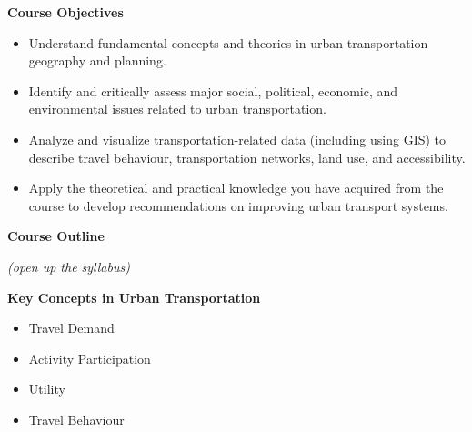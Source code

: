 \documentclass[aspectratio=169]{beamer}
\begin{document}
\begin{frame}

\textbf{Course Objectives}
		\small
		\begin{itemize}
			\item Understand fundamental concepts and theories in urban transportation geography and planning.
			
			\item Identify and critically assess major social, political, economic, and environmental issues related to urban transportation.
			
			\item Analyze and visualize transportation-related data (including using GIS) to describe travel behaviour, transportation networks, land use, and accessibility.
			
			\item Apply the theoretical and practical knowledge you have acquired from the course to develop recommendations on improving urban transport systems.
		\end{itemize}

\end{frame}





\begin{frame}
	\LARGE{\textbf{Course Outline}}
	
	\vspace{4mm}
	
	\small
	\textit{(open up the syllabus)}
\end{frame}





\begin{frame}
	\LARGE{\textbf{Key Concepts in Urban Transportation}}
	\normalsize
	\vspace{4mm}
	\begin{itemize}
		\item Travel Demand
		\item Activity Participation
		\item Utility
		\item Travel Behaviour
	\end{itemize}
\end{frame}
\end{document}
